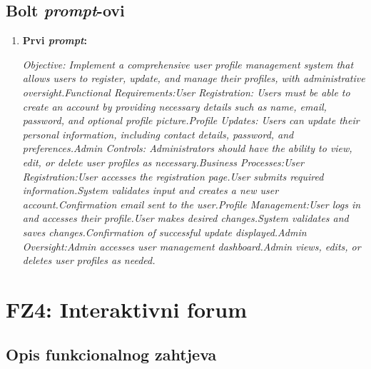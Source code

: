 \subsection{Bolt \textit{prompt}-ovi}

\begin{enumerate}[itemsep=1ex]
    \item \textbf{Prvi \textit{prompt}:}

         \textit{Objective: Implement a comprehensive user profile management system that allows users to register, update, and manage their profiles, with administrative oversight.Functional Requirements:User Registration: Users must be able to create an account by providing necessary details such as name, email, password, and optional profile picture.Profile Updates: Users can update their personal information, including contact details, password, and preferences.Admin Controls: Administrators should have the ability to view, edit, or delete user profiles as necessary.Business Processes:User Registration:User accesses the registration page.User submits required information.System validates input and creates a new user account.Confirmation email sent to the user.Profile Management:User logs in and accesses their profile.User makes desired changes.System validates and saves changes.Confirmation of successful update displayed.Admin Oversight:Admin accesses user management dashboard.Admin views, edits, or deletes user profiles as needed.}
\end{enumerate}

\newpage  
\section{FZ4: Interaktivni forum}

\sloppy

\subsection{Opis funkcionalnog zahtjeva}

